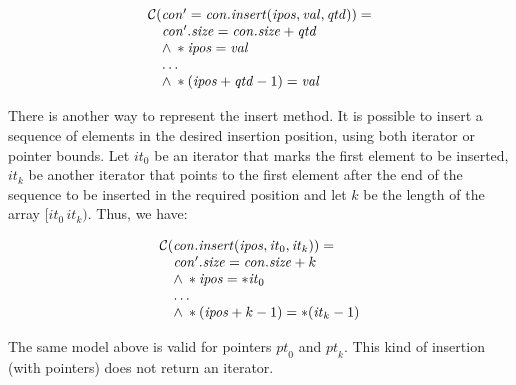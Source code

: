 \documentclass[conference]{IEEEtran}
\begin{document}
\[\begin{array}{ll}
\multicolumn{2}{l}{{\cal C}(\mathit{con}'=\mathit{con.insert}(\mathit{ipos}, \mathit{val}, \mathit{qtd}))=}\\
  &  \mathit{con}'\mathit{.size} = \mathit{con.size} + \mathit{qtd}\\
  & \wedge \: *\mathit{ipos} = \mathit{val} \\
  & \ldots \\
  & \wedge \: *(\mathit{ipos} + \mathit{qtd} - 1) = \mathit{val} \\
\end{array}\]

There is another way to represent the insert method.
It is possible to insert a sequence of elements in the desired
insertion position, using both iterator or pointer bounds.
Let $\mathit{it}_0$ be an iterator that marks the first element
to be inserted, $\mathit{it}_k$ be another iterator that
points to the first element after the end of the sequence to be inserted
in the required position and let $k$ be the length of the array
$[\mathit{it}_0\, \mathit{it}_k)$.
Thus, we have:

\[\begin{array}{ll}
\multicolumn{2}{l}{{\cal C}(\mathit{con.insert}(\mathit{ipos}, \mathit{it}_0, \mathit{it}_k))=}\\
  & \mathit{con}'\mathit{.size} = \mathit{con.size} + k\\
  & \wedge \: *\mathit{ipos} = *\mathit{it}_0 \\
  & \ldots \\
  & \wedge \: *(\mathit{ipos} + k - 1) = *(\mathit{it}_k - 1) \\
\end{array}\]

The same model above is valid for pointers $\mathit{pt}_0$ and $\mathit{pt}_k$.
This kind of insertion (with pointers) does not return an iterator.
\end{document}
